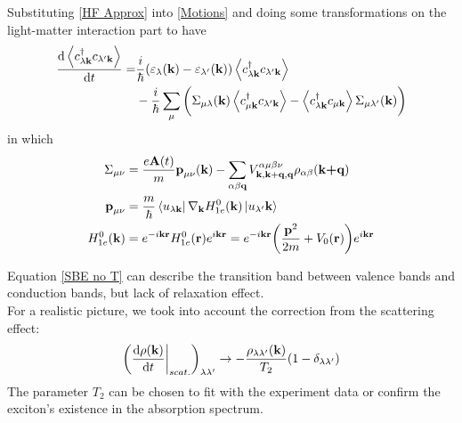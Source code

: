 \documentclass{beamer}
\begin{document}
\begin{frame}
	Substituting \eqref{HF Approx} into \eqref{Motions} and doing some transformations on the light-matter interaction part to have
\begin{align}
\label{SBE no T}
\dv{\ev{c^{\dagger}_{\lambda\textbf{k}} c_{\lambda'\textbf{k}}}}{t} = &\frac{i}{\hbar} (\varepsilon_{\lambda}(\textbf{k}) - \varepsilon_{\lambda'}(\textbf{k}))\ev{c^{\dagger}_{\lambda\textbf{k}} c_{\lambda'\textbf{k}}}\nonumber\\
&-\frac{i}{\hbar} \sum_{\mu}\bigg(\Sigma_{\mu \lambda}(\textbf{k}) \ev{c^{\dagger}_{\mu\textbf{k}} c_{\lambda'\textbf{k}}} - \ev{c^{\dagger}_{\lambda\textbf{k}} c_{\mu\textbf{k}}} \Sigma_{\mu \lambda'}(\textbf{k})\bigg)
\end{align}
in which
\begin{align}
	\Sigma_{\mu\nu} &= \frac{e\textbf{A}(t)}{m}\textbf{p}_{\mu\nu}(\textbf{k}) - \sum_{\alpha\beta\textbf{q}} V^{\alpha \mu \beta \nu}_{\textbf{k},\textbf{k}+\textbf{q},\textbf{q}}\rho_{\alpha \beta}(\textbf{k+q})\\
	\textbf{p}_{\mu \nu} &= \frac{m}{\hbar}\bra{u_{\lambda \textbf{k}}}\nabla_{\textbf{k}}H^0_{1e}(\textbf{k})\ket{u_{\lambda'}\textbf{k}}\\
	H^0_{1e}(\textbf{k}) &= e^{-i\textbf{k}\textbf{r}} H^0_{1e}(\textbf{r})e^{i\textbf{k}\textbf{r}} = e^{-i\textbf{k}\textbf{r}} \bigg(\frac{\textbf{p}^2}{2m} +V_0(\textbf{r})\bigg)e^{i\textbf{k}\textbf{r}}
\end{align}
\end{frame}
\begin{frame}
Equation \eqref{SBE no T} can describe the transition band between valence bands and conduction bands, but lack of relaxation effect.\\\null
\quad For a realistic picture, we took into account the correction from the scattering effect:
\begin{equation}
	\bigg(\dv{\rho(\textbf{k})}{t}\bigg|_{scat.}\bigg)_{\lambda\lambda'} \to - \frac{\rho_{\lambda\lambda'}(\textbf{k})}{T_2}(1-\delta_{\lambda\lambda'})
\end{equation}
\quad The parameter \(T_2\) can be chosen to fit with the experiment data or confirm the exciton's existence in the absorption spectrum.
\end{frame}
\end{document}
